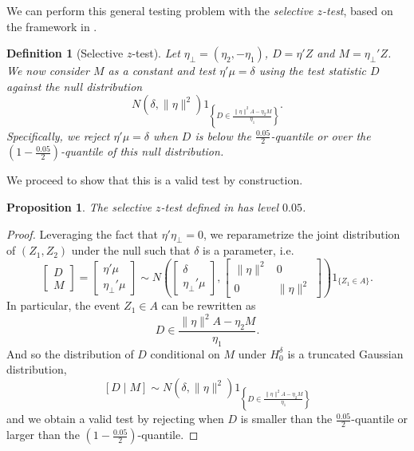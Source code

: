 \documentclass[11pt]{article}
\newtheorem{definition}{Definition}
\newtheorem{proposition}[corollary]{Proposition}
\theoremstyle{definition}
\theoremstyle{custom}
\begin{document}
  We can perform this general testing problem with the {\em selective $z$-test}, based on the framework in \citet{Lee:2016fv}.

  \begin{definition}[Selective $z$-test]
  \label{def:sel-gauss}
    Let $\eta_\perp = (\eta_2, -\eta_1)$, $D = \eta' Z$ and $M = \eta_\perp' Z$. We now consider $M$ as a constant and test $\eta' \mu = \delta$ using the test statistic $D$ against the null distribution
    \[
      N(\delta, \|\eta\|^2) 1_{\left\{D \in \frac{\|\eta\|^2 A - \eta_2 M}{\eta_1}\right\}}.
    \]
    Specifically, we reject $\eta' \mu = \delta$ when $D$ is below the $\frac{0.05}{2}$-quantile or over the $(1 - \frac{0.05}{2})$-quantile of this null distribution.
  \end{definition}

  We proceed to show that this is a valid test by construction.

  \begin{proposition}
  \label{prop:sel-gauss}
    The selective $z$-test defined in  has level $0.05$.
  \end{proposition}

  \begin{proof}
    Leveraging the fact that $\eta' \eta_\perp = 0$, we reparametrize the joint distribution of $(Z_1, Z_2)$ under the null such that $\delta$ is a parameter, i.e.
    \[
      \begin{bmatrix} D \\ M \end{bmatrix} =
      \begin{bmatrix} \eta' \mu \\ \eta_\perp' \mu \end{bmatrix}
      \sim N\left(
      \begin{bmatrix} \delta \\ \eta_\perp' \mu \end{bmatrix},
      \begin{bmatrix}
        \|\eta\|^2 & 0 \\
        0 & \|\eta\|^2
      \end{bmatrix}\right) 1_{\{Z_1 \in A\}}.
    \]
    In particular, the event $Z_1 \in A$ can be rewritten as
    \[
      D \in \frac{\|\eta\|^2 A - \eta_2 M}{\eta_1}.
    \]
    And so the distribution of $D$ conditional on $M$ under $H_0^\delta$ is a truncated Gaussian distribution,
    \[
      [D \mid M] \sim N\left(\delta, \|\eta\|^2\right) 1_{\left\{D \in \frac{\|\eta\|^2 A - \eta_2 M}{\eta_1}\right\}}
    \]
    and we obtain a valid test by rejecting when $D$ is smaller than the $\frac{0.05}{2}$-quantile or larger than the $\left(1 - \frac{0.05}{2}\right)$-quantile.
  \end{proof}
\end{document}
